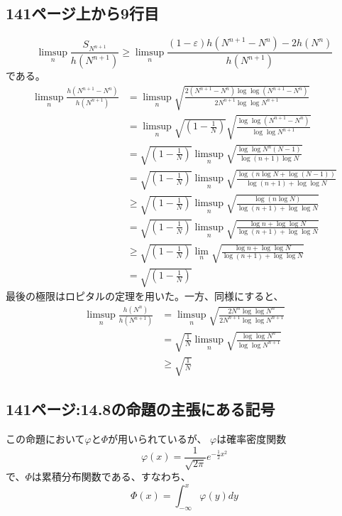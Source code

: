   \subsection{141ページ上から9行目}
    \[
      \limsup_n \frac{S_{N^{n+1}}}{h(N^{n+1})} \ge \limsup_n \frac{(1 - \varepsilon)h(N^{n+1} - N^n) - 2h(N^n)}{h(N^{n+1})}
    \]
    である。
    \begin{align*}
      \limsup_n \frac{h(N^{n+1} - N^n)}{h(N^{n+1})} &= \limsup_n \sqrt{\frac{2(N^{n+1} - N^n)\log\log (N^{n+1} - N^n)}{2N^{n+1} \log\log N^{n+1}}}\\
      &= \limsup_n \sqrt{\left(1 - \frac{1}{N} \right)} \sqrt{\frac{\log\log (N^{n+1} - N^n)}{\log\log N^{n+1}}}\\
      &= \sqrt{\left(1 - \frac{1}{N} \right)} \limsup_n \sqrt{\frac{\log\log N^n(N-1)}{\log (n+1)\log N}}\\
      &= \sqrt{\left(1 - \frac{1}{N} \right)} \limsup_n \sqrt{\frac{\log (n\log N + \log (N-1))}{\log (n+1) + \log\log N}}\\
      &\ge \sqrt{\left(1 - \frac{1}{N} \right)} \limsup_n \sqrt{\frac{\log (n\log N )}{\log (n+1) + \log\log N}}\\
      &= \sqrt{\left(1 - \frac{1}{N} \right)} \limsup_n \sqrt{\frac{\log n + \log\log N }{\log (n+1) + \log\log N}}\\
      &\ge \sqrt{\left(1 - \frac{1}{N} \right)} \lim_n \sqrt{\frac{\log n + \log\log N }{\log (n+1) + \log\log N}}\\
      &= \sqrt{\left(1 - \frac{1}{N} \right)}
    \end{align*}
    最後の極限はロピタルの定理を用いた。一方、同様にすると、
    \begin{align*}
      \limsup_n \frac{h(N^n)}{h(N^{n+1})} &= \limsup_n \sqrt{\frac{2N^n\log\log N^n}{2N^{n+1} \log\log N^{n+1}}}\\
      &= \sqrt{\frac{1}{N}}\limsup_n \sqrt{\frac{\log\log N^n}{\log\log N^{n+1}}}\\
      &\ge \sqrt{\frac{1}{N}}
    \end{align*}

  \subsection{141ページ:14.8の命題の主張にある記号}
    この命題において$\varphi$と$\Phi$が用いられているが、
    $\varphi$は確率密度関数
    \[
      \varphi(x) = \frac{1}{\sqrt{2\pi}}e^{-\frac{1}{2}x^2}
    \]
    で、$\Phi$は累積分布関数である、すなわち、
    \[
      \Phi(x) = \int_{-\infty}^{x} \varphi(y) dy
    \]

